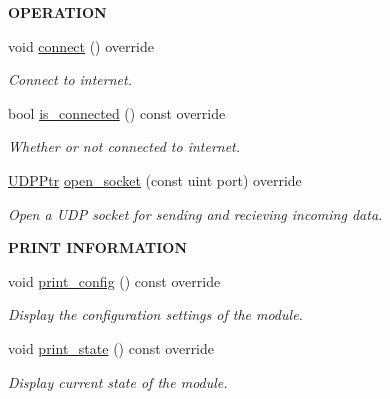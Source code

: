 \begin{Indent}{\bf O\+P\+E\+R\+A\+T\+I\+ON}\par
\begin{DoxyCompactItemize}
\item 
void \hyperlink{class_loom___ethernet_a743f6fa201609c3874bded88390a891e}{connect} () override
\begin{DoxyCompactList}\small\item\em Connect to internet. \end{DoxyCompactList}\item 
bool \hyperlink{class_loom___ethernet_a2770d92b9459361acb44e78694f94964}{is\+\_\+connected} () const override
\begin{DoxyCompactList}\small\item\em Whether or not connected to internet. \end{DoxyCompactList}\item 
\hyperlink{class_loom_internet_plat_a0b2cc742a6ac5f4f7054b75ea99b345c}{U\+D\+P\+Ptr} \hyperlink{class_loom___ethernet_aadfcbd39770e463dbc0383f8d358d89f}{open\+\_\+socket} (const uint port) override
\begin{DoxyCompactList}\small\item\em Open a U\+DP socket for sending and recieving incoming data. \end{DoxyCompactList}\end{DoxyCompactItemize}
\end{Indent}
\begin{Indent}{\bf P\+R\+I\+NT I\+N\+F\+O\+R\+M\+A\+T\+I\+ON}\par
\begin{DoxyCompactItemize}
\item 
void \hyperlink{class_loom___ethernet_a79ed8f208e2fe4faf0a71e468d7ba22e}{print\+\_\+config} () const override
\begin{DoxyCompactList}\small\item\em Display the configuration settings of the module. \end{DoxyCompactList}\item 
void \hyperlink{class_loom___ethernet_a1305b086b7e99c98320ad1d280718259}{print\+\_\+state} () const override
\begin{DoxyCompactList}\small\item\em Display current state of the module. \end{DoxyCompactList}\end{DoxyCompactItemize}
\end{Indent}

